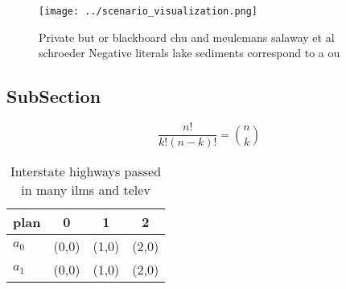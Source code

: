 \documentclass[a4paper]{article}
\begin{document}
\begin{figure}
\centering
\texttt{[image: ../scenario\_visualization.png]}
\caption{Private but or blackboard chu and meulemans salaway et al schroeder Negative literals lake sediments correspond to a ou
}
\end{figure}
 
\subsection{SubSection}

\[ \frac{n!}{k!(n-k)!} = \binom{n}{k} \]

\begin{table}
\begin{adjustbox}{width=0.6\columnwidth}
\begin{tabular}{|l|l|l|l|}
\hline
\textbf{plan} & \multicolumn{1}{c|}{\textbf{0}} & \multicolumn{1}{c|}{\textbf{1}} & \multicolumn{1}{c|}{\textbf{2}} \\ \hline
\textbf{$a_0$}  & (0,0) & (1,0) & (2,0) \\ \hline
\textbf{$a_1$}  & (0,0) & (1,0) & (2,0) \\ \hline
\end{tabular}
\end{adjustbox}
\caption{Interstate highways passed in many ilms and telev
}
\end{table}
\end{document}

